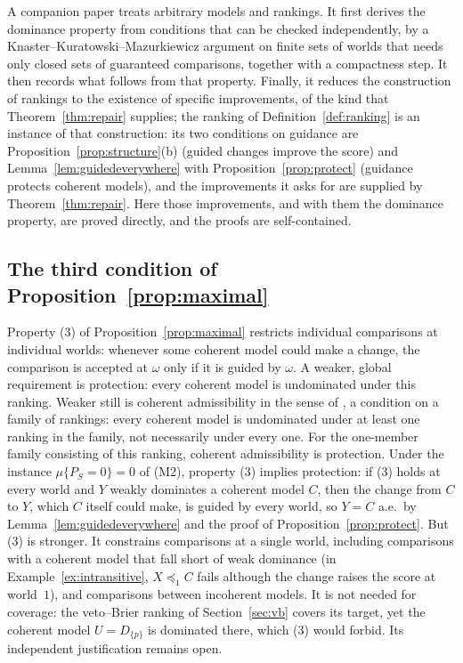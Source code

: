 \documentclass[11pt]{article}
\theoremstyle{plain}
\theoremstyle{definition}
\theoremstyle{remark}
\begin{document}
A companion paper \cite{KCMcompanion} treats arbitrary models and rankings. It first derives
the dominance property from conditions that can be checked independently, by a
Knaster--Kuratowski--Mazurkiewicz argument on finite sets of worlds that needs only closed sets
of guaranteed comparisons, together with a compactness step. It then records what follows from
that property. Finally, it reduces the construction of rankings to the existence of specific
improvements, of the kind that Theorem~\ref{thm:repair} supplies; the ranking of
Definition~\ref{def:ranking} is an instance of that construction: its two conditions on
guidance are Proposition~\ref{prop:structure}(b) (guided changes improve the score) and
Lemma~\ref{lem:guidedeverywhere} with Proposition~\ref{prop:protect} (guidance protects coherent
models), and the improvements it asks for are supplied by Theorem~\ref{thm:repair}. Here those
improvements, and
with them the dominance property, are proved directly, and the proofs are self-contained.

\subsection{The third condition of Proposition~\ref{prop:maximal}}\label{sec:third}

Property (3) of Proposition~\ref{prop:maximal} restricts individual comparisons at individual
worlds: whenever some coherent model could make a change, the comparison is accepted at $\omega$
only if it is guided by $\omega$. A weaker, global requirement is protection: every coherent
model is undominated under this ranking. Weaker still is coherent admissibility in the sense of
\cite{KCMcompanion}, a condition on a family of rankings: every coherent model is undominated
under at least one ranking in the family, not necessarily under every one. For the one-member
family consisting of this ranking, coherent admissibility is protection. Under the instance
$\mu\{P_S=0\}=0$ of (M2), property (3) implies protection: if (3) holds at every world and $Y$
weakly dominates a coherent model $C$, then the change from $C$ to $Y$, which $C$ itself could
make, is guided by every world, so $Y=C$ a.e.\ by Lemma~\ref{lem:guidedeverywhere} and the proof
of Proposition~\ref{prop:protect}. But (3) is stronger. It constrains comparisons at a single
world, including comparisons with a coherent model that fall short of weak dominance (in
Example~\ref{ex:intransitive}, $X\preceq_1C$ fails although the change raises the score at
world~$1$), and comparisons between incoherent models. It is not needed for coverage: the
veto--Brier ranking of Section~\ref{sec:vb} covers its target, yet the coherent model
$U=D_{\{p\}}$ is dominated there, which (3) would forbid. Its independent justification remains
open.
\end{document}
